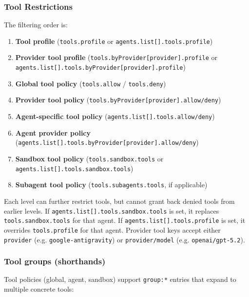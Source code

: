 \subsubsection{Tool Restrictions}


The filtering order is:

\begin{enumerate}
  \item \textbf{Tool profile} (\texttt{tools.profile} or \texttt{agents.list[].tools.profile})
  \item \textbf{Provider tool profile} (\texttt{tools.byProvider[provider].profile} or \texttt{agents.list[].tools.byProvider[provider].profile})
  \item \textbf{Global tool policy} (\texttt{tools.allow} / \texttt{tools.deny})
  \item \textbf{Provider tool policy} (\texttt{tools.byProvider[provider].allow/deny})
  \item \textbf{Agent-specific tool policy} (\texttt{agents.list[].tools.allow/deny})
  \item \textbf{Agent provider policy} (\texttt{agents.list[].tools.byProvider[provider].allow/deny})
  \item \textbf{Sandbox tool policy} (\texttt{tools.sandbox.tools} or \texttt{agents.list[].tools.sandbox.tools})
  \item \textbf{Subagent tool policy} (\texttt{tools.subagents.tools}, if applicable)
\end{enumerate}


Each level can further restrict tools, but cannot grant back denied tools from earlier levels.
If \texttt{agents.list[].tools.sandbox.tools} is set, it replaces \texttt{tools.sandbox.tools} for that agent.
If \texttt{agents.list[].tools.profile} is set, it overrides \texttt{tools.profile} for that agent.
Provider tool keys accept either \texttt{provider} (e.g. \texttt{google-antigravity}) or \texttt{provider/model} (e.g. \texttt{openai/gpt-5.2}).

\subsubsection{Tool groups (shorthands)}


Tool policies (global, agent, sandbox) support \texttt{group:*} entries that expand to multiple concrete tools:

